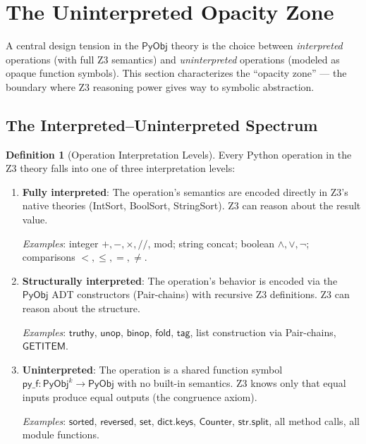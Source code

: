 \documentclass[11pt,a4paper]{report}
\theoremstyle{definition}
\newtheorem{definition}{Definition}[chapter]
\theoremstyle{plain}
\newcommand{\PyObj}{\mathsf{PyObj}}
\begin{document}
\section{The Uninterpreted Opacity Zone}

A central design tension in the $\PyObj$ theory is the choice between
\emph{interpreted} operations (with full Z3 semantics) and
\emph{uninterpreted} operations (modeled as opaque function symbols).
This section characterizes the ``opacity zone'' --- the boundary where
Z3 reasoning power gives way to symbolic abstraction.

\subsection{The Interpreted--Uninterpreted Spectrum}

\begin{definition}[Operation Interpretation Levels]
\label{def:interp-levels}
Every Python operation in the Z3 theory falls into one of three
interpretation levels:
\begin{enumerate}
  \item \textbf{Fully interpreted}: The operation's semantics are
    encoded directly in Z3's native theories (IntSort, BoolSort,
    StringSort).  Z3 can reason about the result value.
    
    \emph{Examples}: integer $+, -, \times, //$, mod; string concat;
    boolean $\land, \lor, \lnot$; comparisons $<, \leq, =, \neq$.
    
  \item \textbf{Structurally interpreted}: The operation's behavior
    is encoded via the $\PyObj$ ADT constructors (Pair-chains) with
    recursive Z3 definitions.  Z3 can reason about the structure.
    
    \emph{Examples}: $\mathsf{truthy}$, $\mathsf{unop}$,
    $\mathsf{binop}$, $\mathsf{fold}$, $\mathsf{tag}$,
    list construction via Pair-chains, $\mathsf{GETITEM}$.
    
  \item \textbf{Uninterpreted}: The operation is a shared function
    symbol $\mathsf{py\_f} : \PyObj^k \to \PyObj$ with no
    built-in semantics.  Z3 knows only that equal inputs produce
    equal outputs (the congruence axiom).
    
    \emph{Examples}: $\mathsf{sorted}$, $\mathsf{reversed}$,
    $\mathsf{set}$, $\mathsf{dict.keys}$, $\mathsf{Counter}$,
    $\mathsf{str.split}$, all method calls, all module functions.
\end{enumerate}
\end{definition}
\end{document}
